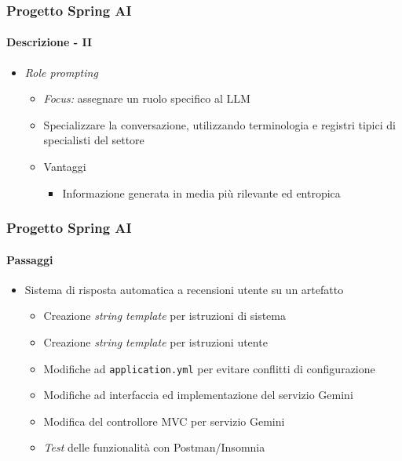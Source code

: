 \begin{frame}[t,fragile] \frametitle{Progetto Spring AI}
    \framesubtitle{Descrizione - II}
    {\small
        \begin{itemize}[leftmargin=10pt,align=right]
            \item[\alertedcircled{2}] \textit{Role prompting}
            \begin{itemize}[leftmargin=10pt,align=right]
                \item[\alert{\faArrowCircleRight}] \textit{Focus:} assegnare un ruolo specifico al LLM
                \item[\alert{\faExclamationTriangle}] Specializzare la conversazione, utilizzando terminologia e registri tipici di specialisti del settore
                \item[\alert{\faArrowCircleRight}] Vantaggi
                \begin{itemize}[leftmargin=10pt,align=right]
                    \item[\alert{\faArrowCircleRight}] Informazione generata in media più rilevante ed entropica
                \end{itemize}              
            \end{itemize}
        \end{itemize}
    }
\end{frame}
%
\begin{frame}[t,fragile] \frametitle{Progetto Spring AI}
    \framesubtitle{Passaggi}
    {\small
        \begin{itemize}[leftmargin=10pt,align=right]
            \item[\alert{\faArrowCircleRight}] Sistema di \alert{risposta automatica} a recensioni utente su un artefatto
            \begin{itemize}[leftmargin=10pt,align=right]
                \item[\alertedcircled{1}] Creazione \textit{string template} per istruzioni di sistema
                \item[\alertedcircled{2}] Creazione \textit{string template} per istruzioni utente
                \item[\alertedcircled{3}] Modifiche ad \texttt{application.yml} per evitare conflitti di configurazione
                 \item[\alertedcircled{4}] Modifiche ad interfaccia ed implementazione del servizio Gemini
                \item[\alertedcircled{5}] Modifica del controllore MVC per servizio Gemini
                \item[\alertedcircled{6}] \textit{Test} delle funzionalità con Postman/Insomnia 
            \end{itemize}
        \end{itemize}
    }
\end{frame}
